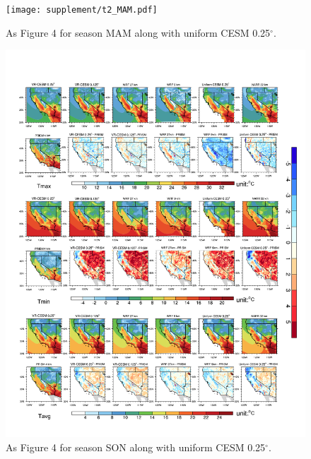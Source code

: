 \begin{figure}
\begin{center}
\texttt{[image: supplement/t2\_MAM.pdf]}
\caption{As Figure 4 for season MAM along with uniform CESM 0.25$^\circ$.}
\end{center}
\end{figure}

\begin{figure}
\begin{center}
\includegraphics[width=6in]{supplement/t2_SON.pdf}
\caption{As Figure 4 for season SON along with uniform CESM 0.25$^\circ$.}
\end{center}
\end{figure}

\clearpage

